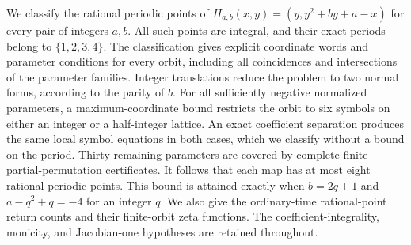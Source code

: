 We classify the rational periodic points of
\(H_{a,b}(x,y)=(y,y^2+by+a-x)\) for every pair of integers \(a,b\).
All such points are integral, and their exact periods belong to
\(\{1,2,3,4\}\). The classification gives explicit coordinate words and
parameter conditions for every orbit, including all coincidences and
intersections of the parameter families. Integer translations reduce the
problem to two normal forms, according to the parity of \(b\). For all
sufficiently negative normalized parameters, a maximum-coordinate bound
restricts the orbit to six symbols on either an integer or a half-integer
lattice. An exact coefficient separation produces the same local symbol
equations in both cases, which we classify without a bound on the period.
Thirty remaining parameters are covered by complete finite
partial-permutation certificates. It follows that each map has at most
eight rational periodic points. This bound is attained exactly when
\(b=2q+1\) and \(a-q^2+q=-4\) for an integer \(q\).
We also give the ordinary-time rational-point return counts and their
finite-orbit zeta functions. The coefficient-integrality, monicity, and
Jacobian-one hypotheses are retained throughout.
